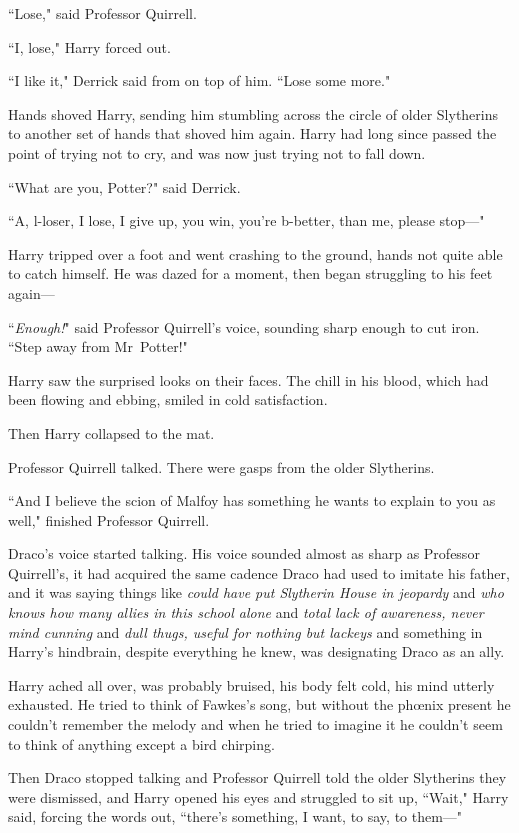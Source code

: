 ``Lose," said Professor Quirrell.

``I, lose," Harry forced out.

``I like it," Derrick said from on top of him. ``Lose some more."

\later

Hands shoved Harry, sending him stumbling across the circle of older Slytherins to another set of hands that shoved him again. Harry had long since passed the point of trying not to cry, and was now just trying not to fall down.

``What are you, Potter?" said Derrick.

``A, l-loser, I lose, I give up, you win, you're b-better, than me, please stop—"

Harry tripped over a foot and went crashing to the ground, hands not quite able to catch himself. He was dazed for a moment, then began struggling to his feet again—

``\emph{Enough!}" said Professor Quirrell's voice, sounding sharp enough to cut iron. ``Step away from Mr~Potter!"

Harry saw the surprised looks on their faces. The chill in his blood, which had been flowing and ebbing, smiled in cold satisfaction.

Then Harry collapsed to the mat.

Professor Quirrell talked. There were gasps from the older Slytherins.

``And I believe the scion of Malfoy has something he wants to explain to you as well," finished Professor Quirrell.

Draco's voice started talking. His voice sounded almost as sharp as Professor Quirrell's, it had acquired the same cadence Draco had used to imitate his father, and it was saying things like \emph{could have put Slytherin House in jeopardy} and \emph{who knows how many allies in this school alone} and \emph{total lack of awareness, never mind cunning} and \emph{dull thugs, useful for nothing but lackeys} and something in Harry's hindbrain, despite everything he knew, was designating Draco as an ally.

Harry ached all over, was probably bruised, his body felt cold, his mind utterly exhausted. He tried to think of Fawkes's song, but without the phœnix present he couldn't remember the melody and when he tried to imagine it he couldn't seem to think of anything except a bird chirping.

Then Draco stopped talking and Professor Quirrell told the older Slytherins they were dismissed, and Harry opened his eyes and struggled to sit up, ``Wait," Harry said, forcing the words out, ``there's something, I want, to say, to them—"

